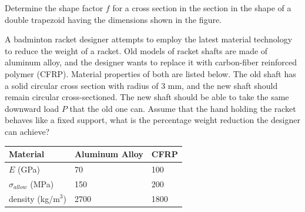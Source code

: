 \documentclass[
10pt,
a4paper,
openany,
svgnames,
]{book} %
\begin{document}
\begin{exercises}
  \exercise Determine the shape factor $f$ for a cross section in the section in the shape of a double trapezoid having the dimensions shown in the figure.

  \begin{figure}[H]
    \centering
  \end{figure}
  
  \exercise A badminton racket designer attempts to employ the latest material technology to reduce the weight of a racket. Old models of racket shafts are made of aluminum alloy, and the designer wants to replace it with carbon-fiber reinforced polymer (CFRP). Material properties of both are listed below. The old shaft has a solid circular cross section with radius of 3 mm, and the new shaft should remain circular cross-sectioned. The new shaft should be able to take the same downward load $P$ that the old one can. Assume that the hand holding the racket behaves like a fixed support, what is the percentage weight reduction the designer can achieve?
	
  \begin{table}[H]
    \centering
    \begin{tabular}{C{3cm}  C{3cm} C{3cm} }
      \toprule
      Material	&		Aluminum Alloy		&		CFRP \\
      \midrule
      $E$ (GPa)	&		70	&		100	\\
      $\sigma_{allow}$	(MPa)	&		150	&		200	\\
      density (kg/m$^3$)	&		2700		&		1800		\\
      \bottomrule
    \end{tabular}
  \end{table}
  
\end{exercises}
\end{document}
